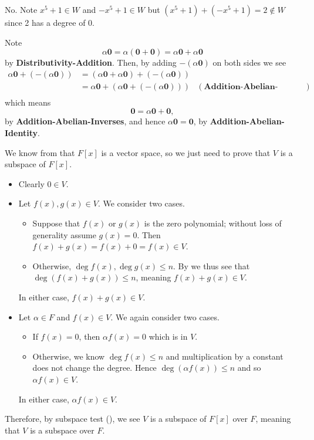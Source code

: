 \begin{questions}
    \item No. Note $x^5 + 1 \in W$ and $-x^5 + 1 \in W$ but $(x^5+1) + (-x^5+1) = 2 \notin W$ since 2 has a degree of 0.

    \item Note
    \[
        \alpha\textbf{0} = \alpha(\textbf{0} + \textbf{0}) = \alpha\textbf{0} + \alpha\textbf{0}
    \]
    by \textbf{Distributivity-Addition}. Then, by adding $-(\alpha\textbf{0})$ on both sides we see
    \begin{align*}
        \alpha\textbf{0} + (-(\alpha\textbf{0})) &= (\alpha\textbf{0} + \alpha\textbf{0}) + (-(\alpha\textbf{0}))\\
        &= \alpha\textbf{0} + (\alpha\textbf{0} + (-(\alpha\textbf{0}))) & (\textbf{Addition-Abelian-Associativity})\\
    \end{align*}
    which means
    \[
        \textbf{0} = \alpha\textbf{0} + \textbf{0},
    \]
    by \textbf{Addition-Abelian-Inverses}, and hence $\alpha\textbf{0} = \textbf{0}$, by \textbf{Addition-Abelian-Identity}.

    \item We know from  that $F[x]$ is a vector space, so we just need to prove that $V$ is a subspace of $F[x]$.
    \begin{itemize}
        \item Clearly $0 \in V$.
        \item Let $f(x), g(x) \in V$. We consider two cases.
        \begin{itemize}
            \item Suppose that $f(x)$ or $g(x)$ is the zero polynomial; without loss of generality assume $g(x) = 0$. Then $f(x) + g(x) = f(x) + 0 = f(x) \in V$.
            \item Otherwise, $\deg f(x), \deg g(x) \leq n$. By  we thus see that $\deg (f(x) + g(x)) \leq n$, meaning $f(x) + g(x) \in V$.
        \end{itemize}
        In either case, $f(x) + g(x) \in V$.
        \item Let $\alpha \in F$ and $f(x) \in V$. We again consider two cases.
        \begin{itemize}
            \item If $f(x) = 0$, then $\alpha f(x) = 0$ which is in $V$.
            \item Otherwise, we know $\deg f(x) \leq n$ and multiplication by a constant does not change the degree. Hence $\deg (\alpha f(x)) \leq n$ and so $\alpha f(x) \in V$.
        \end{itemize}
        In either case, $\alpha f(x) \in V$.
    \end{itemize}
    Therefore, by subspace test (), we see $V$ is a subspace of $F[x]$ over $F$, meaning that $V$ is a subspace over $F$.


\end{questions}
